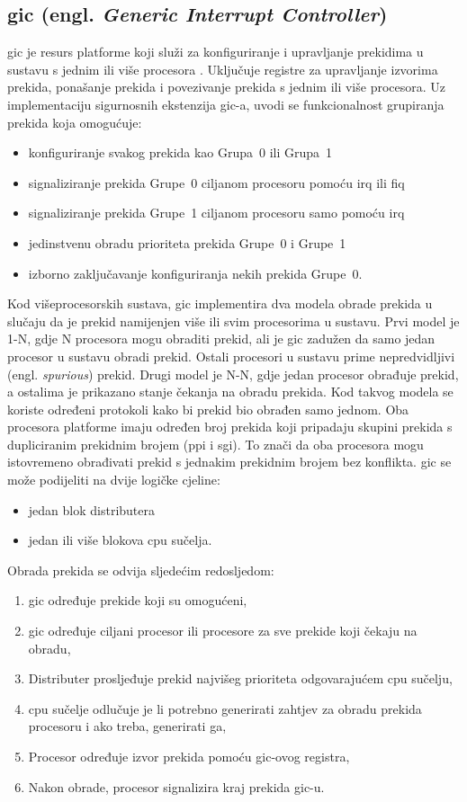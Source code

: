 \documentclass[times, utf8, diplomski, numeric]{fer}
\begin{document}
\subsection{\gls{gic} (engl. \textit{Generic Interrupt Controller})}
\gls{gic} je resurs platforme koji služi za konfiguriranje i upravljanje prekidima u sustavu s jednim ili više procesora
\cite{gic}.
Uključuje registre za upravljanje izvorima prekida, ponašanje prekida i povezivanje prekida s jednim ili više
procesora. Uz implementaciju sigurnosnih ekstenzija \gls{gic}-a, uvodi se funkcionalnost grupiranja prekida koja omogućuje:
\begin{itemize}
  \item{konfiguriranje svakog prekida kao Grupa~0 ili Grupa~1}
  \item{signaliziranje prekida Grupe~0 ciljanom procesoru pomoću \gls{irq} ili \gls{fiq}}
  \item{signaliziranje prekida Grupe~1 ciljanom procesoru samo pomoću \gls{irq}}
  \item{jedinstvenu obradu prioriteta prekida Grupe~0 i Grupe~1}
  \item{izborno zaključavanje konfiguriranja nekih prekida Grupe~0.}
\end{itemize}
Kod višeprocesorskih sustava, \gls{gic} implementira dva modela obrade prekida u slučaju da je prekid namijenjen više
ili svim procesorima u sustavu. Prvi model je 1-N, gdje N procesora mogu obraditi prekid, ali je \gls{gic} zadužen da samo
jedan procesor u sustavu obradi prekid. Ostali procesori u sustavu prime nepredvidljivi (engl. \textit{spurious}) prekid.
Drugi model je N-N, gdje jedan procesor obrađuje prekid, a ostalima je prikazano stanje čekanja na obradu prekida.
Kod takvog modela se koriste određeni protokoli kako bi prekid bio obrađen samo jednom. Oba procesora platforme imaju određen
broj prekida koji pripadaju skupini prekida s dupliciranim prekidnim brojem (\gls{ppi} i \gls{sgi}). To znači da oba procesora mogu
istovremeno obrađivati prekid s jednakim prekidnim brojem bez konflikta. \gls{gic} se može podijeliti na dvije logičke cjeline:
\begin{itemize}
  \item{jedan blok distributera}
  \item{jedan ili više blokova \gls{cpu} sučelja.}
\end{itemize}
Obrada prekida se odvija sljedećim redosljedom:
\begin{enumerate}
  \item{\gls{gic} određuje prekide koji su omogućeni,}
  \item{\gls{gic} određuje ciljani procesor ili procesore za sve prekide koji čekaju na obradu,}
  \item{Distributer prosljeđuje prekid najvišeg prioriteta odgovarajućem \gls{cpu} sučelju,}
  \item{\gls{cpu} sučelje odlučuje je li potrebno generirati zahtjev za obradu prekida procesoru i ako treba, generirati ga,}
  \item{Procesor određuje izvor prekida pomoću \gls{gic}-ovog registra,}
  \item{Nakon obrade, procesor signalizira kraj prekida \gls{gic}-u.}
\end{enumerate}
\end{document}
